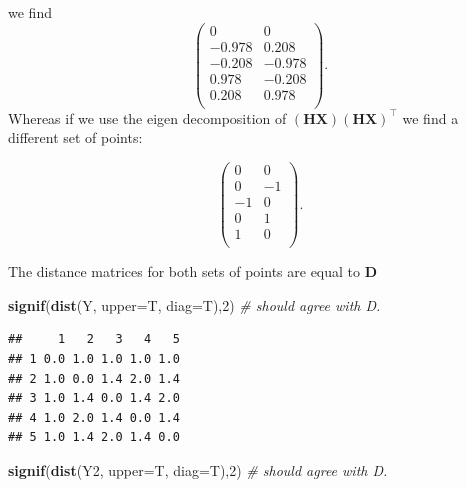 \documentclass[
]{book}
\newenvironment{Shaded}{\begin{snugshade}}{\end{snugshade}}
\newcommand{\AttributeTok}[1]{\textcolor[rgb]{0.13,0.29,0.53}{#1}}
\newcommand{\CommentTok}[1]{\textcolor[rgb]{0.56,0.35,0.01}{\textit{#1}}}
\newcommand{\DecValTok}[1]{\textcolor[rgb]{0.00,0.00,0.81}{#1}}
\newcommand{\FunctionTok}[1]{\textcolor[rgb]{0.13,0.29,0.53}{\textbf{#1}}}
\newcommand{\NormalTok}[1]{#1}
\newcommand{\OtherTok}[1]{\textcolor[rgb]{0.56,0.35,0.01}{#1}}
\newcommand{\SpecialCharTok}[1]{\textcolor[rgb]{0.81,0.36,0.00}{\textbf{#1}}}
\theoremstyle{definition}
\theoremstyle{definition}
\theoremstyle{definition}
\theoremstyle{definition}
\theoremstyle{remark}
\begin{document}
we find
\[\begin{pmatrix}0&0 \\-0.978&0.208 \\-0.208&-0.978 \\0.978&-0.208 \\0.208&0.978 \\\end{pmatrix}.\]
Whereas if we use the eigen decomposition of \((\mathbf H\mathbf X)(\mathbf H\mathbf X)^\top\) we find a different set of points:

\begin{Shaded}
\end{Shaded}

\[\begin{pmatrix}0&0 \\0&-1 \\-1&0 \\0&1 \\1&0 \\\end{pmatrix}.\]

The distance matrices for both sets of points are equal to \(\mathbf D\)

\begin{Shaded}
\begin{Highlighting}[]
\FunctionTok{signif}\NormalTok{(}\FunctionTok{dist}\NormalTok{(Y, }\AttributeTok{upper=}\NormalTok{T, }\AttributeTok{diag=}\NormalTok{T),}\DecValTok{2}\NormalTok{) }\CommentTok{\# should agree with D.}
\end{Highlighting}
\end{Shaded}

\begin{verbatim}
##     1   2   3   4   5
## 1 0.0 1.0 1.0 1.0 1.0
## 2 1.0 0.0 1.4 2.0 1.4
## 3 1.0 1.4 0.0 1.4 2.0
## 4 1.0 2.0 1.4 0.0 1.4
## 5 1.0 1.4 2.0 1.4 0.0
\end{verbatim}

\begin{Shaded}
\begin{Highlighting}[]
\FunctionTok{signif}\NormalTok{(}\FunctionTok{dist}\NormalTok{(Y2, }\AttributeTok{upper=}\NormalTok{T, }\AttributeTok{diag=}\NormalTok{T),}\DecValTok{2}\NormalTok{) }\CommentTok{\# should agree with D.}
\end{Highlighting}
\end{Shaded}
\end{document}
